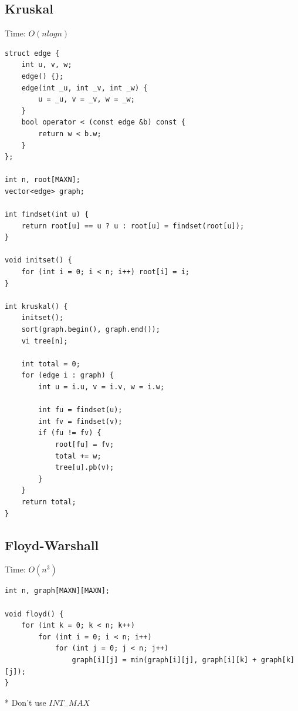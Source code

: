 \documentclass[oneside]{article}
\begin{document}
\subsection{Kruskal}
Time: $O(nlogn)$
\begin{lstlisting}
struct edge {
    int u, v, w;
    edge() {};
    edge(int _u, int _v, int _w) {
        u = _u, v = _v, w = _w;
    }
    bool operator < (const edge &b) const {
        return w < b.w;
    }
};

int n, root[MAXN];
vector<edge> graph;

int findset(int u) {
    return root[u] == u ? u : root[u] = findset(root[u]);
}

void initset() {
    for (int i = 0; i < n; i++) root[i] = i;
}

int kruskal() {
    initset();
    sort(graph.begin(), graph.end());
    vi tree[n];
    
    int total = 0;
    for (edge i : graph) {
        int u = i.u, v = i.v, w = i.w;

        int fu = findset(u);
        int fv = findset(v);
        if (fu != fv) {
            root[fu] = fv;
            total += w;
            tree[u].pb(v);
        }
    }
    return total;
}
\end{lstlisting}

\subsection{Floyd-Warshall}
Time: $O(n^3)$
\begin{lstlisting}
int n, graph[MAXN][MAXN];

void floyd() {
    for (int k = 0; k < n; k++)
        for (int i = 0; i < n; i++)
            for (int j = 0; j < n; j++)
                graph[i][j] = min(graph[i][j], graph[i][k] + graph[k][j]);
}
\end{lstlisting}
* Don't use $INT_-$$MAX$
\pagebreak
\end{document}
